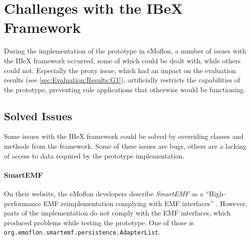 \section{Challenges with the IBeX Framework}
\label{sec:Implementation:Challenges}

During the implementation of the prototype in eMoflon, a number of issues with the IBeX framework occurred, some of which could be dealt with, while others could not.
Especially the proxy issue, which had an impact on the evaluation results (see \autoref{sec:Evaluation:Results:G1}), artificially restricts the capabilities of the prototype, preventing rule applications that otherwise would be functioning.

\subsection{Solved Issues}
\label{sec:Implementation:Challenges:solved}

Some issues with the IBeX framework could be solved by overriding classes and methods from the framework. Some of these issues are bugs, others are a lacking of access to data required by the prototype implementation.
\paragraph{SmartEMF} On their website, the eMoflon developers describe \emph{SmartEMF} as a \enquote{High-performance EMF reimplementation complying with EMF interfaces} \cite{noauthor_emoflonibex_nodate}.
However, parts of the implementation do not comply with the EMF interfaces, which produced problems while testing the prototype.
One of those is \texttt{org.emoflon.smartemf.persistence.AdapterList}.


